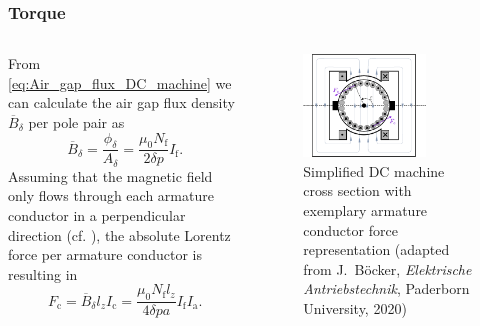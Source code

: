 \begin{frame}
	\frametitle{Torque}
	\begin{columns}
	\begin{column}{0.45\textwidth}
    From \eqref{eq:Air_gap_flux_DC_machine} we can calculate the air gap flux density $\overline{B}_\delta$ per pole pair as
	\begin{equation}
		\overline{B}_\delta = \frac{\phi_\delta}{A_\delta} = \frac{\mu_0 N_\mathrm{f}}{2 \delta p} I_\mathrm{f}.
		\label{eq:Air_gap_flux_density_DC_machine}
	\end{equation}\pause
	Assuming that the magnetic field only flows through each armature conductor in a perpendicular direction (cf. ), the absolute Lorentz force per armature conductor is resulting in
	\begin{equation}
		F_\mathrm{c} =  \overline{B}_\delta l_z I_\mathrm{c}= \frac{\mu_0 N_\mathrm{f} l_z}{4 \delta p a}I_\mathrm{f} I_\mathrm{a}.
		\label{eq:Lorentz_force_DC_machine_conductor}
	\end{equation}
\end{column}
\hfill
\begin{column}{0.55\textwidth}
	\begin{figure}
		\centering
		\includegraphics[width=0.725\textwidth]{fig/lec03/DC_machine_cross_section_force_torque.pdf}
		\caption{Simplified DC machine cross section with exemplary armature conductor force representation (adapted from J.~B\"ocker, \textit{Elektrische Antriebstechnik}, Paderborn University, 2020)}
		\label{fig:DC_machine_cross_section_force_torque}
	\end{figure}
\end{column}
\end{columns}
\end{frame}

